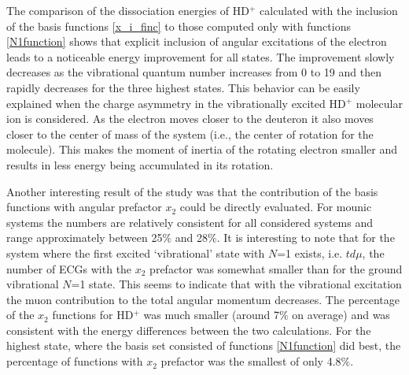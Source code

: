 The comparison of the dissociation energies of HD$^+$ calculated with the
inclusion of the basis functions \ref{x_i_finc} to those computed only with 
functions \ref{N1function} shows that explicit inclusion of angular excitations 
of the electron leads to a noticeable energy improvement for all states.
The improvement slowly decreases as the vibrational quantum number increases 
from 0 to 19 and then rapidly decreases for the three highest states. 
This behavior can be easily explained when the charge asymmetry in the 
vibrationally excited HD$^+$ molecular ion is considered.
As the electron moves closer to the deuteron it also moves closer to the 
center of mass of the system (i.e., the center of rotation for the molecule). 
This makes the moment of inertia of the rotating electron smaller and results 
in less energy being accumulated in its rotation.

Another interesting result of the study was that the contribution of the basis 
functions with angular prefactor $x_2$ could be directly evaluated.
For mounic systems the numbers are relatively consistent for all considered systems 
and range approximately between 25$\%$ and 28$\%$. It is interesting to note that for 
the system where the first excited ‘vibrational’ state with $N$=1 exists, i.e. $td\mu$, 
the number of ECGs with the $x_2$ prefactor was somewhat smaller than for the ground vibrational $N$=1 state. This seems to indicate that with the vibrational excitation 
the muon contribution to the total angular momentum decreases.
The percentage of the $x_2$ functions for HD$^+$ was much smaller (around 7$\%$ on average)
and was consistent with the energy differences between the two calculations.
For the highest state, where the basis set consisted of functions \ref{N1function}
did best, the percentage of functions with $x_2$ prefactor was the smallest of only 4.8$\%$.  










